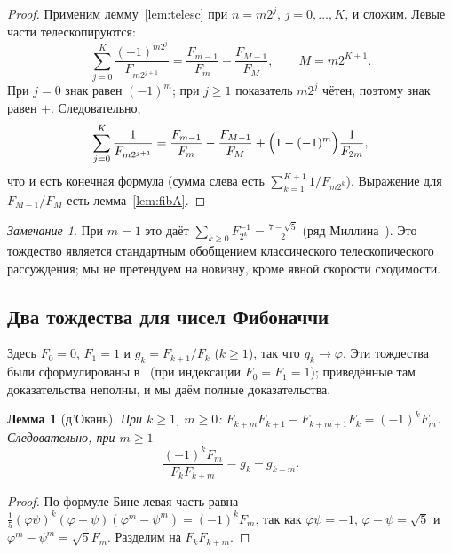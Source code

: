 \documentclass[a4paper,14pt]{extreport}
\theoremstyle{plain}
\newtheorem{lemma}{Лемма}[section]
\theoremstyle{definition}
\theoremstyle{remark}
\newtheorem{remark}{Замечание}
\begin{document}
\begin{proof}
	Применим лемму~\ref{lem:telesc} при $n=m2^j$, $j=0,\dots,K$, и сложим. Левые части телескопируются:
	\begin{equation}
		\sum_{j=0}^{K}\frac{(-1)^{m2^j}}{F_{m2^{j+1}}}=\frac{F_{m-1}}{F_m}-\frac{F_{M-1}}{F_M},\qquad M=m2^{K+1}.
	\end{equation}
	При $j=0$ знак равен $(-1)^m$; при $j\ge1$ показатель $m2^j$ чётен, поэтому знак равен $+$. Следовательно,
	\begin{equation}
		\sum_{j=0}^{K}\frac1{F_{m2^{j+1}}}=\frac{F_{m-1}}{F_m}-\frac{F_{M-1}}{F_M}+\Bigl(1-(-1)^m\Bigr)\frac1{F_{2m}},
	\end{equation}
	что и есть конечная формула (сумма слева есть $\sum_{k=1}^{K+1}1/F_{m2^k}$). Выражение для $F_{M-1}/F_M$ есть лемма~\ref{lem:fibA}.
\end{proof}

\begin{remark}
	При $m=1$ это даёт $\sum_{k\ge0}F_{2^k}^{-1}=\frac{7-\sqrt5}2$ (ряд Миллина~\cite{Millin}). Это тождество является стандартным обобщением классического
	телескопического рассуждения; мы не претендуем на новизну, кроме явной скорости сходимости.
\end{remark}
\subsection{Два тождества для чисел Фибоначчи}\label{sec:identDF}

Здесь $F_0=0$, $F_1=1$ и $g_k=F_{k+1}/F_k$ ($k\ge1$), так что $g_k\to\varphi$. Эти тождества были сформулированы в~\cite{AbdullahHam}
(при индексации $F_0=F_1=1$); приведённые там доказательства неполны, и мы даём полные доказательства.

\begin{lemma}[д'Окань]\label{lem:docagne}
	При $k\ge1$, $m\ge0$: $F_{k+m}F_{k+1}-F_{k+m+1}F_k=(-1)^kF_m$. Следовательно, при $m\ge1$
	\begin{equation}
		\frac{(-1)^kF_m}{F_kF_{k+m}}=g_k-g_{k+m}.
	\end{equation}
\end{lemma}
\begin{proof}
	По формуле Бине левая часть равна
	$\frac15(\varphi\psi)^k(\varphi-\psi)(\varphi^m-\psi^m)=(-1)^kF_m$, так как $\varphi\psi=-1$, $\varphi-\psi=\sqrt5$ и $\varphi^m-\psi^m=\sqrt5F_m$.
	Разделим на $F_kF_{k+m}$.
\end{proof}
\end{document}
